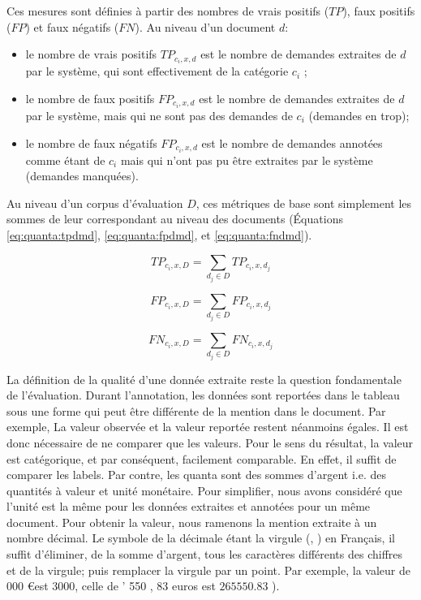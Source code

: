 Ces mesures sont définies à partir des nombres de vrais positifs ($TP$), faux positifs ($FP$) et faux négatifs ($FN$). Au niveau d'un document $d$:
\begin{itemize}
\item le nombre de vrais positifs $TP_{c_i, x, d}$ est le nombre de demandes extraites de $d$ par le système, qui sont effectivement de la catégorie $c_i$ ;
\item le nombre de faux positifs $FP_{c_i, x, d}$ est le nombre de demandes extraites de $d$ par le système, mais qui ne sont pas des demandes de $c_i$ (demandes en trop);
\item le nombre de faux négatifs $FP_{c_i, x, d}$ est le nombre de demandes annotées comme étant de $c_i$ mais qui n'ont pas pu être extraites par le système (demandes manquées).
\end{itemize}

Au niveau d'un corpus d'évaluation $D$, ces métriques de base sont simplement les sommes de leur correspondant au niveau des documents (Équations \ref{eq:quanta:tpdmd}, \ref{eq:quanta:fpdmd}, et \ref{eq:quanta:fndmd}).

\begin{equation}
TP_{c_i,x,D} = \sum\limits_{d_j \in D} TP_{c_i,x,d_j} \label{eq:quanta:tpdmd}
\end{equation}

\begin{equation}
FP_{c_i,x,D} = \sum\limits_{d_j \in D} FP_{c_i,x,d_j} \label{eq:quanta:fpdmd}
\end{equation}

\begin{equation}
FN_{c_i,x,D} = \sum\limits_{d_j \in D} FN_{c_i,x,d_j} \label{eq:quanta:fndmd}
\end{equation}


La définition de la qualité d'une donnée extraite reste la question fondamentale de l'évaluation. Durant l'annotation, les données sont reportées dans le tableau sous une forme qui peut être différente de la mention dans le document. Par exemple,  La valeur observée et la valeur reportée restent néanmoins égales. Il est donc nécessaire de ne comparer que les valeurs. Pour le sens du résultat, la valeur est catégorique, et par conséquent, facilement comparable. En effet, il suffit de comparer les labels. Par contre, les quanta sont des sommes d'argent i.e. des quantités à valeur et unité monétaire. Pour simplifier, nous avons considéré que l'unité est la même pour les données extraites et annotées pour un même document. Pour obtenir la valeur, nous ramenons la mention extraite à un nombre décimal. Le symbole de la décimale étant la virgule (\og , \fg) en Français, il suffit d'éliminer, de la somme d'argent, tous les caractères différents des chiffres et de la virgule; puis remplacer la virgule par un point. Par exemple, la valeur de  000 \euro \fg est $3000$, celle de  ' 550 , 83 euros \fg est $265550.83$ ).



